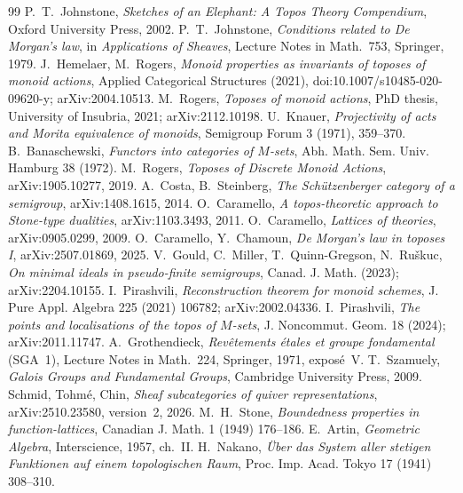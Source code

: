 \begin{thebibliography}{99}
 P.~T.~Johnstone, \emph{Sketches of an Elephant: A Topos Theory Compendium}, Oxford University Press, 2002.
 P.~T.~Johnstone, \emph{Conditions related to De Morgan's law}, in \emph{Applications of Sheaves}, Lecture Notes in Math.~753, Springer, 1979.
 J.~Hemelaer, M.~Rogers, \emph{Monoid properties as invariants of toposes of monoid actions}, Applied Categorical Structures (2021), doi:10.1007/s10485-020-09620-y; arXiv:2004.10513.
 M.~Rogers, \emph{Toposes of monoid actions}, PhD thesis, University of Insubria, 2021; arXiv:2112.10198.
 U.~Knauer, \emph{Projectivity of acts and Morita equivalence of monoids}, Semigroup Forum 3 (1971), 359--370.
 B.~Banaschewski, \emph{Functors into categories of $M$-sets}, Abh. Math. Sem. Univ. Hamburg 38 (1972).
 M.~Rogers, \emph{Toposes of Discrete Monoid Actions}, arXiv:1905.10277, 2019.
 A.~Costa, B.~Steinberg, \emph{The Schützenberger category of a semigroup}, arXiv:1408.1615, 2014.
 O.~Caramello, \emph{A topos-theoretic approach to Stone-type dualities}, arXiv:1103.3493, 2011.
 O.~Caramello, \emph{Lattices of theories}, arXiv:0905.0299, 2009.
 O.~Caramello, Y.~Chamoun, \emph{De Morgan's law in toposes I}, arXiv:2507.01869, 2025.
 V.~Gould, C.~Miller, T.~Quinn-Gregson, N.~Ruškuc, \emph{On minimal ideals in pseudo-finite semigroups}, Canad. J. Math. (2023); arXiv:2204.10155.
 I.~Pirashvili, \emph{Reconstruction theorem for monoid schemes}, J. Pure Appl. Algebra 225 (2021) 106782; arXiv:2002.04336.
 I.~Pirashvili, \emph{The points and localisations of the topos of $M$-sets}, J. Noncommut. Geom. 18 (2024); arXiv:2011.11747.
 A.~Grothendieck, \emph{Revêtements étales et groupe fondamental} (SGA~1), Lecture Notes in Math.~224, Springer, 1971, exposé~V.
 T.~Szamuely, \emph{Galois Groups and Fundamental Groups}, Cambridge University Press, 2009.
 Schmid, Tohmé, Chin, \emph{Sheaf subcategories of quiver representations}, arXiv:2510.23580, version~2, 2026.
 M.~H.~Stone, \emph{Boundedness properties in function-lattices}, Canadian J. Math. 1 (1949) 176--186.
 E.~Artin, \emph{Geometric Algebra}, Interscience, 1957, ch.~II.
 H.~Nakano, \emph{Über das System aller stetigen Funktionen auf einem topologischen Raum}, Proc. Imp. Acad. Tokyo 17 (1941) 308--310.

\end{thebibliography}
